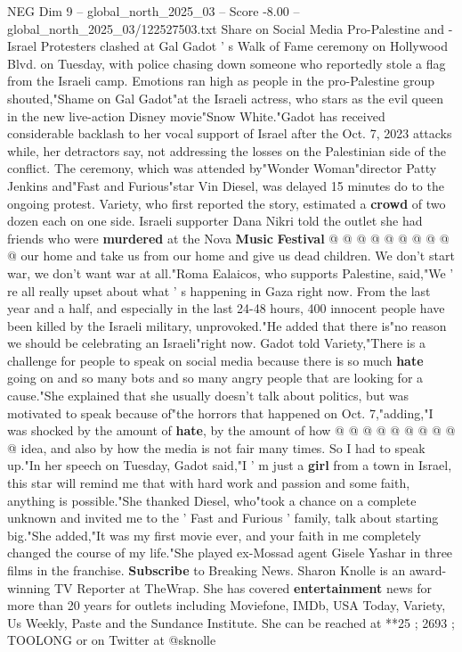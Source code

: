 \begin{textsample}{NEG Dim 9 – global\_north\_2025\_03 – Score -8.00 – global\_north\_2025\_03/122527503.txt}  \label{ex:f9_neg_142}
Share on Social Media Pro-Palestine and -Israel Protesters clashed at Gal Gadot ' s Walk of Fame ceremony on Hollywood Blvd. on Tuesday, with police chasing down someone who reportedly stole a flag from the Israeli camp.
Emotions ran high as people in the pro-Palestine group shouted,"Shame on Gal Gadot"at the Israeli actress, who stars as the evil queen in the new live-action Disney movie"Snow White."Gadot has received considerable backlash to her vocal support of Israel after the Oct. 7, 2023 attacks while, her detractors say, not addressing the losses on the Palestinian side of the conflict.
The ceremony, which was attended by"Wonder Woman"director Patty Jenkins and"Fast and Furious"star Vin Diesel, was delayed 15 minutes do to the ongoing protest.
Variety, who first reported the story, estimated a \textbf{crowd} of two dozen each on one side.
Israeli supporter Dana Nikri told the outlet she had friends who were \textbf{murdered} at the Nova \textbf{Music} \textbf{Festival} @ @ @ @ @ @ @ @ @ @ our home and take us from our home and give us dead children.
We don't start war, we don't want war at all."Roma Ealaicos, who supports Palestine, said,"We ' re all really upset about what ' s happening in Gaza right now.
From the last year and a half, and especially in the last 24-48 hours, 400 innocent people have been killed by the Israeli military, unprovoked."He added that there is"no reason we should be celebrating an Israeli"right now.
Gadot told Variety,"There is a challenge for people to speak on social media because there is so much \textbf{hate} going on and so many bots and so many angry people that are looking for a cause."She explained that she usually doesn't talk about politics, but was motivated to speak because of"the horrors that happened on Oct. 7,"adding,"I was shocked by the amount of \textbf{hate}, by the amount of how @ @ @ @ @ @ @ @ @ @ idea, and also by how the media is not fair many times.
So I had to speak up."In her speech on Tuesday, Gadot said,"I ' m just a \textbf{girl} from a town in Israel, this star will remind me that with hard work and passion and some faith, anything is possible."She thanked Diesel, who"took a chance on a complete unknown and invited me to the ' Fast and Furious ' family, talk about starting big."She added,"It was my first movie ever, and your faith in me completely changed the course of my life."She played ex-Mossad agent Gisele Yashar in three films in the franchise. \textbf{Subscribe} to Breaking News.
Sharon Knolle is an award-winning TV Reporter at TheWrap.
She has covered \textbf{entertainment} news for more than 20 years for outlets including Moviefone, IMDb, USA Today, Variety, Us Weekly, Paste and the Sundance Institute.
She can be reached at **25 ; 2693 ; TOOLONG or on Twitter at @sknolle

\end{textsample}
